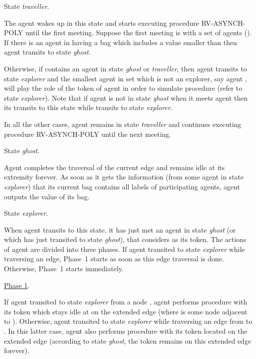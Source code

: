 \documentclass [11pt] {article}
\begin{document}
\vspace*{0.3cm}

\noindent
State {\em traveller}.

{The agent  wakes up in this state and starts executing procedure RV-ASYNCH-POLY  until the first meeting. Suppose the first meeting is with a set  of agents (). If there is an agent in  having a bag which includes a value smaller than  then agent  transits to state {\em ghost}.} 

{Otherwise, if  contains an agent in state
{\em ghost} or {\em traveller}, then agent  transits to state {\em explorer} and the smallest agent in set  which is not an explorer, say agent , will play the role of the token of agent  in order to simulate procedure  (refer to state {\em explorer}). Note that if agent  is not in state {\em ghost} when it meets agent  then its transits to this state while  transits to state {\em explorer}}.

{In all the other cases, agent  remains in state {\em traveller} and continues executing procedure RV-ASYNCH-POLY until the next meeting.}

\vspace*{0.3cm}

\noindent
State {\em ghost}.

{Agent  completes the traversal of the current edge and remains idle at its extremity forever.
As soon as it gets the information (from some agent in state {\em explorer}) that its current bag contains all labels of participating agents, agent  outputs the value of its bag.}

\vspace*{0.3cm}

\noindent
State {\em explorer}.

{When agent  transits to this state, it has just met an agent  in state {\em ghost} (or which has just transited to state {\em ghost}), that  considers as its token.
The actions of agent  are divided into three phases. If agent  transited to state {\em explorer} while traversing an edge, Phase~1 starts as soon as this edge traversal is done. Otherwise, Phase~1 starts immediately.}

\noindent \underline{Phase 1}.

{If agent  transited to state {\em explorer} from a node , agent  performs procedure  with its token which stays idle at  on the extended edge  (where  is some node adjacent to ). Otherwise, agent  transited to state {\em explorer} while traversing an edge  from  to . In this latter case, agent  also performs procedure  with its token located on the extended edge  (according to state {\em ghost}, the token remains on this extended edge forever)}.
\end{document}

